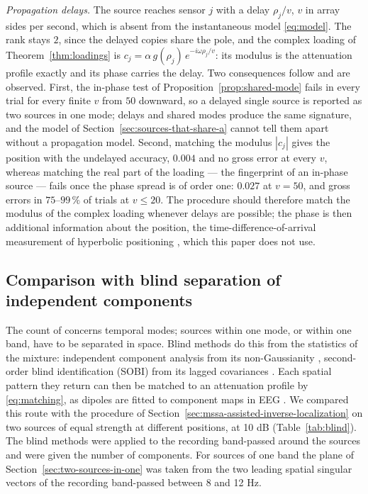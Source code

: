 \documentclass{article}
\begin{document}
\emph{Propagation delays.} The source reaches sensor $j$ with a delay $\rho_j / v$, $v$ in array sides per second, which is absent from the instantaneous model \eqref{eq:model}. The rank stays $2$, since the delayed copies share the pole, and the complex loading of Theorem~\ref{thm:loadings} is $c_j = \alpha\, g(\rho_j)\, e^{-i\omega \rho_j / v}$: its modulus is the attenuation profile exactly and its phase carries the delay. Two consequences follow and are observed. First, the in-phase test of Proposition~\ref{prop:shared-mode} fails in every trial for every finite $v$ from $50$ downward, so a delayed single source is reported as two sources in one mode; delays and shared modes produce the same signature, and the model of Section~\ref{sec:sources-that-share-a} cannot tell them apart without a propagation model. Second, matching the modulus $|c_j|$ gives the position with the undelayed accuracy, $0.004$ and no gross error at every $v$, whereas matching the real part of the loading --- the fingerprint of an in-phase source --- fails once the phase spread is of order one: $0.027$ at $v = 50$, and gross errors in $75$--$99\,\%$ of trials at $v \le 20$. The procedure should therefore match the modulus of the complex loading whenever delays are possible; the phase is then additional information about the position, the time-difference-of-arrival measurement of hyperbolic positioning \cite{ref-Chan, ref-Torrieri}, which this paper does not use.

\subsection{Comparison with blind separation of independent components}\label{sec:comparison-with-blind-separation}

The count of \cite{ref-BernadotteBuchstaber, ref-Bernadotte05, ref-companionA} concerns temporal modes; sources within one mode, or within one band, have to be separated in space. Blind methods do this from the statistics of the mixture: independent component analysis from its non-Gaussianity \cite{ref-Comon, ref-Hyvarinen}, second-order blind identification (SOBI) from its lagged covariances \cite{ref-Belouchrani}. Each spatial pattern they return can then be matched to an attenuation profile by \eqref{eq:matching}, as dipoles are fitted to component maps in EEG \cite{ref-Delorme}. We compared this route with the procedure of Section~\ref{sec:mssa-assisted-inverse-localization} on two sources of equal strength at different positions, at 10 dB (Table~\ref{tab:blind}). The blind methods were applied to the recording band-passed around the sources and were given the number of components. For sources of one band the plane of Section~\ref{sec:two-sources-in-one} was taken from the two leading spatial singular vectors of the recording band-passed between 8 and 12 Hz.
\end{document}
